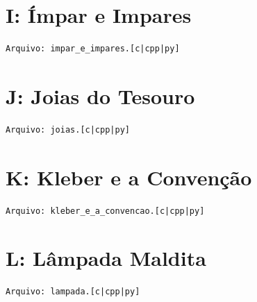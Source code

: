 \documentclass[12pt,oneside]{article} %
\begin{document}
\newpage
\section*{I: Ímpar e Impares} %
\vspace{-0.52cm}
\noindent \begin{verbatim}Arquivo: impar_e_impares.[c|cpp|py]\end{verbatim}


\newpage
\section*{J: Joias do Tesouro} %
\vspace{-0.52cm}
\noindent \begin{verbatim}Arquivo: joias.[c|cpp|py]\end{verbatim}


\newpage
\section*{K: Kleber e a Convenção} %
\vspace{-0.52cm}
\noindent \begin{verbatim}Arquivo: kleber_e_a_convencao.[c|cpp|py]\end{verbatim}


\newpage
\section*{L: Lâmpada Maldita} %
\vspace{-0.52cm}
\noindent \begin{verbatim}Arquivo: lampada.[c|cpp|py]\end{verbatim}

\end{document}
